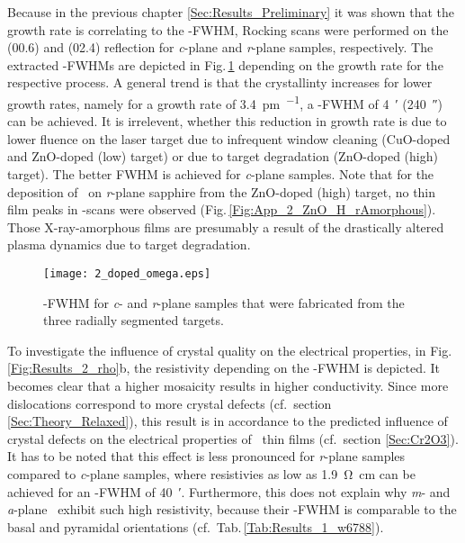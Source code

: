 Because in the previous chapter \ref{Sec:Results_Preliminary} it was shown that the growth rate is correlating to the \textomega-FWHM, Rocking scans were performed on the (00.6) and (02.4) reflection for \textit{c}-plane and \textit{r}-plane samples, respectively.
The extracted \textomega-FWHMs are depicted in Fig.\,\ref{Fig:Results_2_omega} depending on the growth rate for the respective process.
A general trend is that the crystallinty increases for lower growth rates, namely for a growth rate of \qty{3.4}{\pm\per\pulse}, a \textomega-FWHM of \qty{4}{\arcminute} (\qty{240}{\arcsecond}) can be achieved.
It is irrelevent, whether this reduction in growth rate is due to lower fluence on the laser target due to infrequent window cleaning (CuO-doped and ZnO-doped (low) target) or due to target degradation (ZnO-doped (high) target).
The better FWHM is achieved for \textit{c}-plane samples.
Note that for the deposition of \cro\ on \textit{r}-plane sapphire from the ZnO-doped (high) target, no thin film peaks in \thetaomega-scans were observed (Fig.\,\ref{Fig:App_2_ZnO_H_rAmorphous}).
Those X-ray-amorphous films are presumably a result of the drastically altered plasma dynamics due to target degradation.
\begin{figure}
    \centering
    \texttt{[image: 2\_doped\_omega.eps]}
    \caption{\textomega-FWHM for \textit{c}- and \textit{r}-plane samples that were fabricated from the three radially segmented targets.}
    \label{Fig:Results_2_omega}
\end{figure}

{%
\sloppy
To investigate the influence of crystal quality on the electrical properties, in Fig.\,\ref{Fig:Results_2_rho}b, the resistivity depending on the \textomega-FWHM is depicted. %
It becomes clear that a higher mosaicity results in higher conductivity.
Since more dislocations correspond to more crystal defects (cf.\ section \ref{Sec:Theory_Relaxed}), this result is in accordance to the predicted influence of crystal defects on the electrical properties of \cro\ thin films (cf.\ section \ref{Sec:Cr2O3}).
It has to be noted that this effect is less pronounced for \textit{r}-plane samples compared to \textit{c}-plane samples, where resistivies as low as \qty{1.9}{\ohm\cm} can be achieved for an \textomega-FWHM of \qty{40}{\arcminute}.
Furthermore, this does not explain why \textit{m}- and \textit{a}-plane \cro\ exhibit such high resistivity, because their \textomega-FWHM is comparable to the basal and pyramidal orientations (cf.\ Tab.\,\ref{Tab:Results_1_w6788}).
\par}

